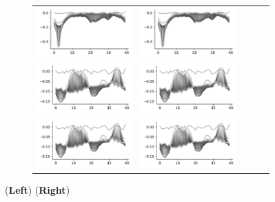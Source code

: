 \begin{figure}[t]
  \centering
 \begin{subfigure}{0.95\textwidth}
    \begin{tabular}{ccccc}
      \includegraphics[width=0.25\linewidth]{figures/theory/rf_sim/ising_varphi.pdf} &
      \includegraphics[width=0.25\linewidth]{figures/theory/rf_sim/ising_varphi.pdf} \\ 
      \includegraphics[width=0.25\linewidth]{figures/theory/rf_sim/gaussian_varphi.pdf} &
      \includegraphics[width=0.25\linewidth]{figures/theory/rf_sim/gaussian_varphi.pdf} \\ 
      \includegraphics[width=0.25\linewidth]{figures/theory/rf_sim/alg5_varphi.pdf} &
      \includegraphics[width=0.25\linewidth]{figures/theory/rf_sim/alg5_varphi.pdf} \\ 
    \end{tabular}
  \end{subfigure}
  \caption{
    (\textbf{Left})
    (\textbf{Right})
  }
  \label{fig:experiments}
\end{figure}
